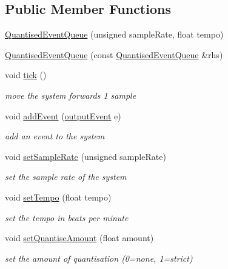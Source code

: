 \subsection*{Public Member Functions}
\begin{DoxyCompactItemize}
\item 
\hyperlink{classQuantisedEventQueue_a98edbab612078a6b8662be1e02ec7d5d}{Quantised\+Event\+Queue} (unsigned sample\+Rate, float tempo)
\item 
\hyperlink{classQuantisedEventQueue_a531b0d61f7e3f2bb5891916f7ee2f981}{Quantised\+Event\+Queue} (const \hyperlink{classQuantisedEventQueue}{Quantised\+Event\+Queue} \&rhs)
\item 
void \hyperlink{classQuantisedEventQueue_a97055bead1291aef1d540640fcb61bf9}{tick} ()
\begin{DoxyCompactList}\small\item\em move the system forwards 1 sample \end{DoxyCompactList}\item 
void \hyperlink{classQuantisedEventQueue_a381591648286fab71836e6930d0f86d9}{add\+Event} (\hyperlink{structQuantisedEventQueue_1_1outputEvent}{output\+Event} e)
\begin{DoxyCompactList}\small\item\em add an event to the system \end{DoxyCompactList}\item 
void \hyperlink{classQuantisedEventQueue_a8a228847e9840052560ad27b7c48988d}{set\+Sample\+Rate} (unsigned sample\+Rate)
\begin{DoxyCompactList}\small\item\em set the sample rate of the system \end{DoxyCompactList}\item 
void \hyperlink{classQuantisedEventQueue_aa779e58dd906e9d2ddee9187296fca80}{set\+Tempo} (float tempo)
\begin{DoxyCompactList}\small\item\em set the tempo in beats per minute \end{DoxyCompactList}\item 
void \hyperlink{classQuantisedEventQueue_aa26d3254efa6178b559caf8978c46e17}{set\+Quantise\+Amount} (float amount)
\begin{DoxyCompactList}\small\item\em set the amount of quantisation (0=none, 1=strict) \end{DoxyCompactList}\item 

\end{DoxyCompactItemize}
